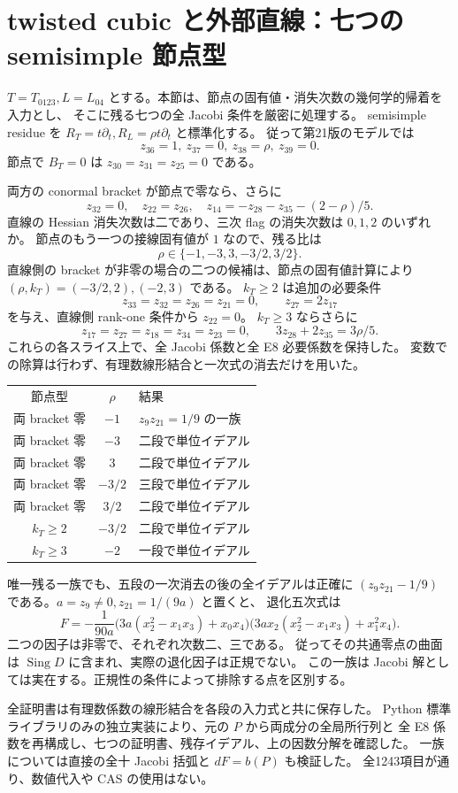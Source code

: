 \section{twisted cubic と外部直線：七つの semisimple 節点型}

$T=T_{0123},L=L_{04}$ とする。本節は、節点の固有値・消失次数の幾何学的帰着を入力とし、
そこに残る七つの全 Jacobi 条件を厳密に処理する。
semisimple residue を $R_T=t\partial_t,R_L=\rho t\partial_t$ と標準化する。
従って第21版のモデルでは
\[
z_{36}=1,\ z_{37}=0,\ z_{38}=\rho,\ z_{39}=0.
\]
節点で $B_T=0$ は $z_{30}=z_{31}=z_{25}=0$ である。

両方の conormal bracket が節点で零なら、さらに
\[
z_{32}=0,\quad z_{22}=z_{26},\quad
z_{14}=-z_{28}-z_{35}-(2-\rho)/5.
\]
直線の Hessian 消失次数は二であり、三次 flag の消失次数は $0,1,2$ のいずれか。
節点のもう一つの接線固有値が $1$ なので、残る比は
\[
\rho\in\{-1,-3,3,-3/2,3/2\}.
\]
直線側の bracket が非零の場合の二つの候補は、節点の固有値計算により
$(\rho,k_T)=(-3/2,2),(-2,3)$ である。
$k_T\ge2$ は追加の必要条件
\[
z_{33}=z_{32}=z_{26}=z_{21}=0,\qquad z_{27}=2z_{17}
\]
を与え、直線側 rank-one 条件から $z_{22}=0$。
$k_T\ge3$ ならさらに
\[
z_{17}=z_{27}=z_{18}=z_{34}=z_{23}=0,
\qquad 3z_{28}+2z_{35}=3\rho/5.
\]
これらの各スライス上で、全 Jacobi 係数と全 E8 必要係数を保持した。
変数での除算は行わず、有理数線形結合と一次式の消去だけを用いた。

\begin{center}
\begin{tabular}{ccl}
節点型 & $\rho$ & 結果\\
両 bracket 零 & $-1$ & $z_9z_{21}=1/9$ の一族\\
両 bracket 零 & $-3$ & 二段で単位イデアル\\
両 bracket 零 & $3$ & 二段で単位イデアル\\
両 bracket 零 & $-3/2$ & 三段で単位イデアル\\
両 bracket 零 & $3/2$ & 二段で単位イデアル\\
$k_T\ge2$ & $-3/2$ & 二段で単位イデアル\\
$k_T\ge3$ & $-2$ & 一段で単位イデアル
\end{tabular}
\end{center}

唯一残る一族でも、五段の一次消去の後の全イデアルは正確に
$(z_9z_{21}-1/9)$ である。$a=z_9\ne0,z_{21}=1/(9a)$ と置くと、
退化五次式は
\[
F=-\frac1{90a}
\bigl(3a(x_2^2-x_1x_3)+x_0x_4\bigr)
\bigl(3ax_2(x_2^2-x_1x_3)+x_1^2x_4\bigr).
\]
二つの因子は非零で、それぞれ次数二、三である。
従ってその共通零点の曲面は $\operatorname{Sing}D$ に含まれ、実際の退化因子は正規でない。
この一族は Jacobi 解としては実在する。正規性の条件によって排除する点を区別する。

全証明書は有理数係数の線形結合を各段の入力式と共に保存した。
Python 標準ライブラリのみの独立実装により、元の $P$ から両成分の全局所行列と
全 E8 係数を再構成し、七つの証明書、残存イデアル、上の因数分解を確認した。
一族については直接の全十 Jacobi 括弧と $dF=b(P)$ も検証した。
全1243項目が通り、数値代入や CAS の使用はない。
